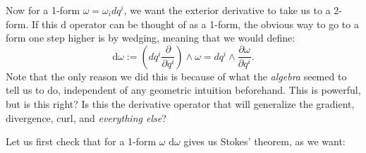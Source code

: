 \documentclass[../master.tex]{subfiles}
\begin{document}
	Now for a 1-form $\omega = \omega_i dq^i$, we want the exterior derivative to take us to a 2-form. If this $\mathrm d$ operator can be thought of as a 1-form, the obvious way to go to a form one step higher is by wedging, meaning that we would define:
	\begin{equation}\label{eq:exterior_derivative2}
		\mathrm d \omega := (dq^i \frac{\partial}{\partial q^i}) \wedge \omega= dq^i \wedge \frac{\partial \omega}{\partial q^i}.
	\end{equation}
	Note that the only reason we did this is because of what the \emph{algebra} seemed to tell us to do, independent of any geometric intuition beforehand. This is powerful, but is this right? Is this the derivative operator that will generalize the gradient, divergence, curl, and \emph{everything else}?
	
	Let us first check that for a 1-form $\omega$ $\mathrm d \omega$ gives us Stokes' theorem, as we want:
	
\end{document}
